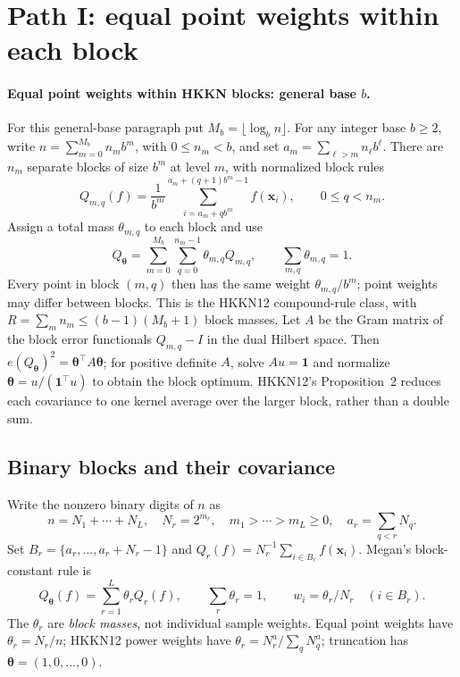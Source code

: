 \documentclass[11pt]{article}
\newcommand{\bbone}{\boldsymbol{1}}
\newcommand{\btheta}{\boldsymbol{\theta}}
\newcommand{\bx}{\boldsymbol{x}}
\begin{document}
\section{Path I: equal point weights within each block}\label{sec:blockpath}
\paragraph{Equal point weights within HKKN blocks: general base $b$.}
For this general-base paragraph put $M_b=\lfloor\log_b n\rfloor$.
For any integer base $b\ge2$, write
$n=\sum_{m=0}^{M_b} n_m b^m$, with $0\le n_m<b$, and set
$a_m=\sum_{\ell>m}n_\ell b^\ell$.
There are $n_m$ separate blocks of size $b^m$ at level $m$, with
normalized block rules
\[
 Q_{m,q}(f)=\frac1{b^m}
 \sum_{i=a_m+q b^m}^{a_m+(q+1)b^m-1}f(\bx_i),
 \qquad 0\le q<n_m.
\]
Assign a total mass $\theta_{m,q}$ to each block and use
\[
 Q_{\btheta}=\sum_{m=0}^{M_b}\sum_{q=0}^{n_m-1}
 \theta_{m,q}Q_{m,q},\qquad
 \sum_{m,q}\theta_{m,q}=1.
\]
Every point in block $(m,q)$ then has the same weight
$\theta_{m,q}/b^m$; point weights may differ between blocks.
This is the HKKN12 compound-rule class, with
$R=\sum_m n_m\le(b-1)(M_b+1)$ block masses.
Let $A$ be the Gram matrix of the block error functionals
$Q_{m,q}-I$ in the dual Hilbert space. Then
$e(Q_{\btheta})^2=\btheta^\top A\btheta$; for positive definite $A$,
solve $Au=\bbone$ and normalize $\btheta=u/(\bbone^\top u)$
to obtain the block optimum.
HKKN12's Proposition~2 reduces each covariance to one kernel average
over the larger block, rather than a double sum.

\subsection{Binary blocks and their covariance}
Write the nonzero binary digits of $n$ as
\[
 n=N_1+\cdots+N_L,\quad N_r=2^{m_r},\quad
 m_1>\cdots>m_L\ge0,\quad a_r=\sum_{q<r}N_q.
\]
Set $B_r=\{a_r,\ldots,a_r+N_r-1\}$ and
$Q_r(f)=N_r^{-1}\sum_{i\in B_r}f(\bx_i)$.
Megan's block-constant rule is
\begin{equation}\label{eq:compound}
 Q_{\btheta}(f)=\sum_{r=1}^L\theta_rQ_r(f),\qquad
 \sum_r\theta_r=1,\qquad w_i=\theta_r/N_r\quad(i\in B_r).
\end{equation}
The $\theta_r$ are \emph{block masses}, not individual sample weights.
Equal point weights have $\theta_r=N_r/n$;
HKKN12 power weights have $\theta_r=N_r^a/\sum_qN_q^a$;
truncation has $\btheta=(1,0,\ldots,0)$.
\end{document}
